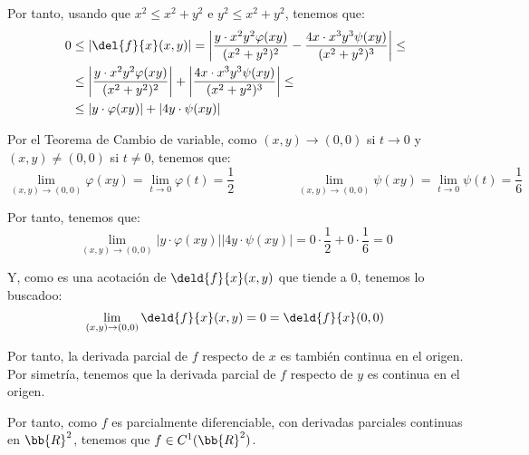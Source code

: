 \begin{ejercicio}
    Por tanto, usando que $x^2\leq x^2+y^2$ e $y^2\leq x^2+y^2$, tenemos que:
    \begin{align*}
        0& \leq \left|\del{f}{x}(x,y)\right|
        = \left|\frac{y\cdot x^2y^2\varphi(xy)}{(x^2+y^2)^2}
        - \frac{4x\cdot x^3y^3\psi(xy)}{(x^2+y^2)^3}\right| \leq \\&\leq
        \left|\frac{y\cdot x^2y^2\varphi(xy)}{(x^2+y^2)^2}\right|
        + \left|\frac{4x\cdot x^3y^3\psi(xy)}{(x^2+y^2)^3}\right| \leq \\&\leq
        \left|y\cdot \varphi(xy)\right| + \left|4y\cdot \psi(xy)\right|
    \end{align*}

    Por el Teorema de Cambio de variable, como $(x,y)\to (0,0)$ si $t\to 0$ y $(x,y)\neq (0,0)$ si $t\neq 0$, tenemos que:
    \begin{equation*}
        \lim_{(x,y)\to (0,0)} \varphi(xy) = \lim_{t\to 0} \varphi(t) = \frac{1}{2} \hspace{2cm}
        \lim_{(x,y)\to (0,0)} \psi(xy) = \lim_{t\to 0} \psi(t) = \frac{1}{6}
    \end{equation*}

    Por tanto, tenemos que:
    \begin{equation*}
        \lim_{(x,y)\to (0,0)} \left|y\cdot \varphi(xy)\right|
        \left|4y\cdot \psi(xy)\right|
        = 0\cdot \frac{1}{2} + 0\cdot \frac{1}{6} = 0
    \end{equation*}

    Y, como es una acotación de $\deld{f}{x}(x,y)$ que tiende a $0$, tenemos lo buscadoo:
    $$\lim\limits_{(x,y)\to (0,0)} \deld{f}{x}(x,y) = 0 = \deld{f}{x}(0,0)$$

    Por tanto, la derivada parcial de $f$ respecto de $x$ es también continua en el origen.
    Por simetría, tenemos que la derivada parcial de $f$ respecto de $y$ es continua en el origen.

    Por tanto, como $f$ es parcialmente diferenciable, con derivadas parciales continuas en $\bb{R}^2$, tenemos que $f\in C^1(\bb{R}^2)$.
\end{ejercicio}